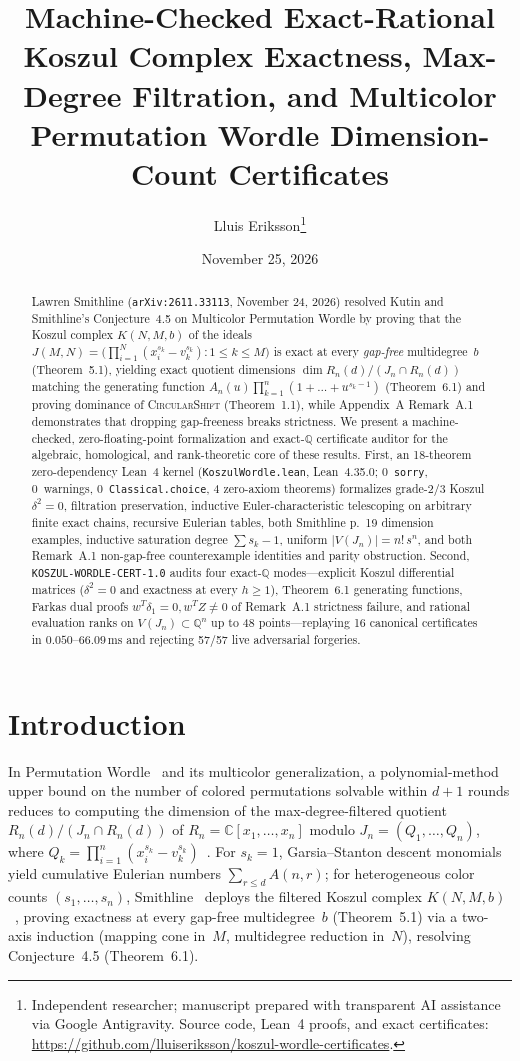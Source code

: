 \documentclass[11pt,twocolumn]{article}
\title{\textbf{Machine-Checked Exact-Rational Koszul Complex Exactness, Max-Degree Filtration, and Multicolor Permutation Wordle Dimension-Count Certificates}}
\author{Lluis Eriksson\thanks{Independent researcher; manuscript prepared with transparent AI assistance via Google Antigravity. Source code, Lean~4 proofs, and exact certificates: \url{https://github.com/lluiseriksson/koszul-wordle-certificates}.}}
\date{November 25, 2026}
\newcommand{\QQ}{\mathbb{Q}}
\begin{document}
\maketitle

\begin{abstract}
Lawren Smithline (\texttt{arXiv:2611.33113}, November 24, 2026) resolved Kutin and Smithline's Conjecture~4.5 on Multicolor Permutation Wordle by proving that the Koszul complex $K(N, M, b)$ of the ideals $J(M, N) = \bigl(\prod_{i=1}^N (x_i^{s_k} - v_k^{s_k}) : 1 \le k \le M\bigr)$ is exact at every \emph{gap-free} multidegree~$b$ (Theorem~5.1), yielding exact quotient dimensions $\dim R_n(d)/(J_n \cap R_n(d))$ matching the generating function $A_n(u)\prod_{k=1}^n(1+\dots+u^{s_k-1})$ (Theorem~6.1) and proving dominance of \textsc{CircularShift} (Theorem~1.1), while Appendix~A Remark~A.1 demonstrates that dropping gap-freeness breaks strictness. We present a machine-checked, zero-floating-point formalization and exact-$\QQ$ certificate auditor for the algebraic, homological, and rank-theoretic core of these results. First, an 18-theorem zero-dependency Lean~4 kernel (\texttt{KoszulWordle.lean}, Lean~4.35.0; 0~\texttt{sorry}, 0~warnings, 0~\texttt{Classical.choice}, 4 zero-axiom theorems) formalizes grade-2/3 Koszul $\delta^2=0$, filtration preservation, inductive Euler-characteristic telescoping on arbitrary finite exact chains, recursive Eulerian tables, both Smithline p.~19 dimension examples, inductive saturation degree $\sum s_k - 1$, uniform $|V(J_n)| = n!\,s^n$, and both Remark~A.1 non-gap-free counterexample identities and parity obstruction. Second, \texttt{KOSZUL-WORDLE-CERT-1.0} audits four exact-$\QQ$ modes—explicit Koszul differential matrices ($\delta^2=0$ and exactness at every $h\ge 1$), Theorem~6.1 generating functions, Farkas dual proofs $w^T\delta_1=0, w^TZ\neq 0$ of Remark~A.1 strictness failure, and rational evaluation ranks on $V(J_n) \subset \QQ^n$ up to 48 points—replaying 16 canonical certificates in $0.050$--$66.09\,\mathrm{ms}$ and rejecting 57/57 live adversarial forgeries.
\end{abstract}

\section{Introduction}
In Permutation Wordle~\cite{kutin2024wordle} and its multicolor generalization, a polynomial-method upper bound on the number of colored permutations solvable within $d+1$ rounds reduces to computing the dimension of the max-degree-filtered quotient $R_n(d) / (J_n \cap R_n(d))$ of $R_n = \mathbb{C}[x_1,\dots,x_n]$ modulo $J_n = (Q_1,\dots,Q_n)$, where $Q_k = \prod_{i=1}^n (x_i^{s_k} - v_k^{s_k})$~\cite{smithline2026koszul}. For $s_k = 1$, Garsia--Stanton descent monomials~\cite{garsia1984stanley} yield cumulative Eulerian numbers $\sum_{r \le d} A(n,r)$; for heterogeneous color counts $(s_1,\dots,s_n)$, Smithline~\cite{smithline2026koszul} deploys the filtered Koszul complex $K(N, M, b)$~\cite{eisenbud1995commutative}, proving exactness at every gap-free multidegree~$b$ (Theorem~5.1) via a two-axis induction (mapping cone in~$M$, multidegree reduction in~$N$), resolving Conjecture~4.5 (Theorem~6.1).
\end{document}
